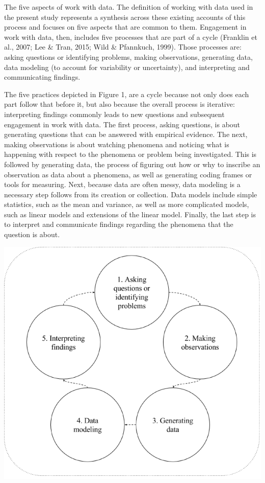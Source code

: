 \documentclass[]{msu-thesis}
\theoremstyle{definition}
\theoremstyle{definition}
\theoremstyle{definition}
\theoremstyle{remark}
\begin{document}
The five aspects of work with data. The definition of working with data
used in the present study represents a synthesis across these existing
accounts of this process and focuses on five aspects that are common to
them. Engagement in work with data, then, includes five processes that
are part of a cycle (Franklin et al., 2007; Lee \& Tran, 2015; Wild \&
Pfannkuch, 1999). Those processes are: asking questions or identifying
problems, making observations, generating data, data modeling (to
account for variability or uncertainty), and interpreting and
communicating findings.

The five practices depicted in Figure 1, are a cycle because not only
does each part follow that before it, but also because the overall
process is iterative: interpreting findings commonly leads to new
questions and subsequent engagement in work with data. The first
process, asking questions, is about generating questions that can be
answered with empirical evidence. The next, making observations is about
watching phenomena and noticing what is happening with respect to the
phenomena or problem being investigated. This is followed by generating
data, the process of figuring out how or why to inscribe an observation
as data about a phenomena, as well as generating coding frames or tools
for measuring. Next, because data are often messy, data modeling is a
necessary step follows from its creation or collection. Data models
include simple statistics, such as the mean and variance, as well as
more complicated models, such as linear models and extensions of the
linear model. Finally, the last step is to interpret and communicate
findings regarding the phenomena that the question is about.

\begin{center}\includegraphics[width=0.8\linewidth]{images/figure1} \end{center}
\end{document}
